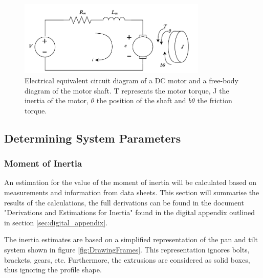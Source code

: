 \documentclass[../../main.tex]{subfiles}
\begin{document}
\begin{figure}[H]
    \centering
    \includegraphics[width=0.8\textwidth]{Sections/System_Modelling/Images/motor_armaturer_REAL.pdf}
    \caption{Electrical equivalent circuit diagram of a DC motor and a free-body diagram of the motor shaft. T represents the motor torque, J the inertia of the motor, $\theta$ the position of the shaft and $b\dot{\theta}$ the friction torque. \cite{universityofmichigan2019}}
    \label{fig:Armature_Circuit}
\end{figure}




\subsection{Determining System Parameters}\label{subsec:motorParameters}
\subsubsection*{Moment of Inertia}
An estimation for the value of the moment of inertia will be calculated based on measurements and information from data sheets. This section will summarise the results of the calculations, the full derivations can be found in the document "Derivations and Estimations for Inertia" found in the digital appendix outlined in section \ref{sec:digital_appendix}.



The inertia estimates are based on a simplified representation of the pan and tilt system shown in figure \ref{fig:DrawingFrames}. This representation ignores bolts, brackets, gears, etc. Furthermore, the extrusions are considered as solid boxes, thus ignoring the profile shape.
\end{document}
